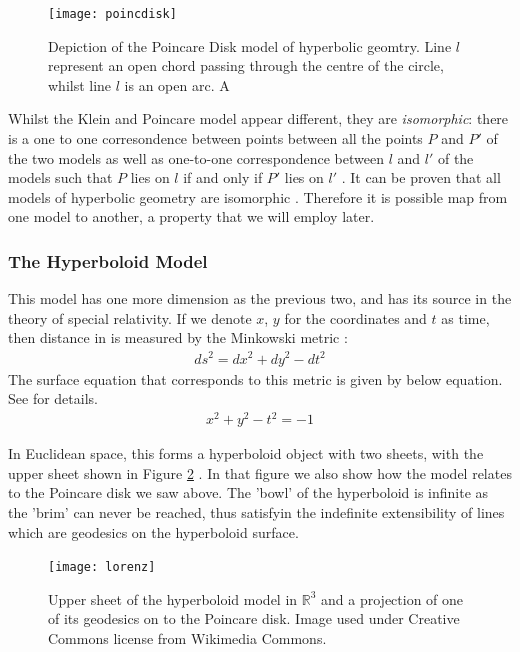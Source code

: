 \documentclass[12pt]{report}
\begin{document}
\begin{figure}
  \centering
	\texttt{[image: poincdisk]}
	\caption{Depiction of the Poincare Disk model of hyperbolic geomtry. Line $l$ represent an open chord passing through the centre of the circle, whilst line $l$ is an open arc. A 
}
	\label{fig:pdisk}
\end{figure}

Whilst the Klein and Poincare model appear different, they are \textit{isomorphic}: there is a one to one corresondence between points between all the points $P$ and $P'$ of the two models as well as one-to-one correspondence between $l$ and $l'$ of the models such that $P$ lies on $l$ if and only if $P'$ lies on $l'$ \cite{Greenberg1994}. It can be proven that all models of hyperbolic geometry are isomorphic \cite{Greenberg1994}. Therefore it is possible map from one model to another, a property that we will employ later.

\subsubsection{The Hyperboloid Model}
This model has one more dimension as the previous two, and has its source in the theory of special relativity. If we denote $x$, $y$ for the coordinates and $t$ as time, then distance in is measured by the Minkowski metric \cite{Greenberg1994}:
\begin{align*}
  ds^2 = dx^2 + dy^2 - dt^2
\end{align*}
The surface equation that corresponds to this metric is given by below equation. See \cite{Greenberg1994} for details.
\begin{align*}
  x^2 + y^2 - t^2 = -1 
\end{align*}

In Euclidean space, this forms a hyperboloid object with two sheets, with the upper sheet shown in Figure \ref{fig:lorenz} \cite{Greenberg1994}. In that figure we also show how the model relates to the Poincare disk we saw above. The 'bowl' of the hyperboloid is infinite as the 'brim' can never be reached, thus satisfyin the indefinite extensibility of lines which are geodesics on the hyperboloid surface.

\begin{figure}
  \centering
	\texttt{[image: lorenz]}
	\caption{Upper sheet of the hyperboloid model in $\mathbb{R}^3$ and a projection of one of its geodesics on to the Poincare disk. Image used under Creative Commons license from Wikimedia Commons.}
	\label{fig:lorenz}
\end{figure}
\end{document}
